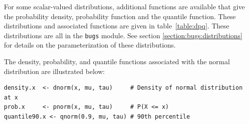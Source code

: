 \documentclass[11pt, a4paper, titlepage]{report}
\begin{document}
For some scalar-valued distributions, additional functions are
available that give the probability density, probability function and
the quantile function. These distributions and associated functions
are given in table~\ref{table:dpq}. These distributions are all in the
\texttt{bugs} module. See section \ref{section:bugs:distributions} for
details on the parameterization of these distributions.

The density, probability, and quantile functions associated with the
normal distribution are illustrated below:
\begin{verbatim}
density.x  <- dnorm(x, mu, tau)     # Density of normal distribution at x
prob.x     <- pnorm(x, mu, tau)     # P(X <= x)
quantile90.x <- qnorm(0.9, mu, tau) # 90th percentile
\end{verbatim}
\end{document}

